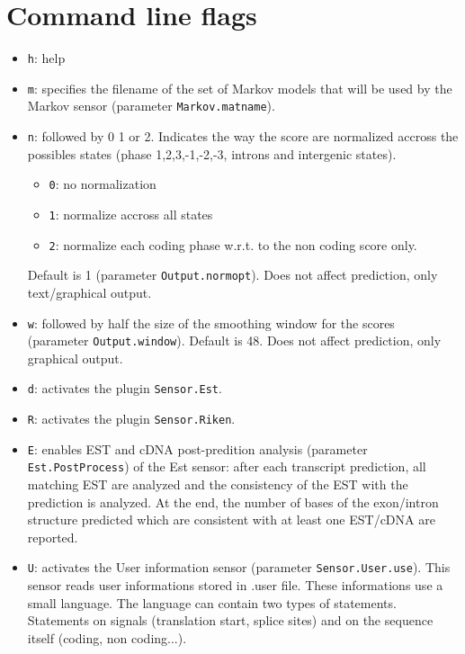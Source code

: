 \documentclass[a4paper,titlepage]{report}
\begin{document}
\section{Command line flags}
 
\begin{itemize}
\item \texttt{h}: help
  
\item \texttt{m}: specifies the filename of the set of Markov models that will
  be used by the Markov sensor (parameter \texttt{Markov.matname}).

\item \texttt{n}: followed by 0 1 or 2. Indicates the way the score are
  normalized accross the possibles states (phase 1,2,3,-1,-2,-3,
  introns and intergenic states). 
  \begin{itemize}
  \item \texttt{0}: no normalization
  \item \texttt{1}: normalize accross all states
  \item \texttt{2}: normalize each coding phase w.r.t. to the non coding
    score only.
  \end{itemize}
  Default is 1 (parameter \texttt{Output.normopt}). Does not affect
  prediction, only text/graphical output.
  
\item \texttt{w}: followed by half the size of the smoothing window for the
  scores (parameter \texttt{Output.window}). Default is 48. Does not
  affect prediction, only graphical output.
 
\item \texttt{d}: activates the plugin \texttt{Sensor.Est}.
  
\item \texttt{R}: activates the plugin \texttt{Sensor.Riken}.
  
\item \texttt{E}: enables EST and cDNA post-predition analysis (parameter
  \texttt{Est.PostProcess}) of the Est sensor: after each transcript
  prediction, all matching EST are analyzed and the consistency of the
  EST with the prediction is analyzed. At the end, the number of bases
  of the exon/intron structure predicted which are consistent with at
  least one EST/cDNA are reported.
  
\item \texttt{U}: activates the User information sensor (parameter
  \texttt{Sensor.User.use}). This sensor reads user informations
  stored in .user file. These informations use a small language. The
  language can contain two types of statements. Statements on signals
  (translation start, splice sites) and on the sequence itself
  (coding, non coding...).
  

\end{itemize}
\end{document}
